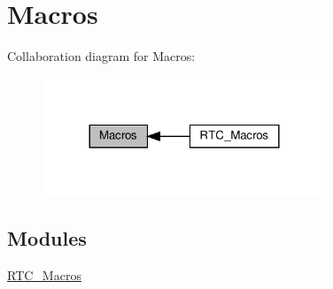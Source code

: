 \hypertarget{group___project}{}\section{Macros}
\label{group___project}
Collaboration diagram for Macros\+:
\nopagebreak
\begin{figure}[H]
\begin{center}
\leavevmode
\includegraphics[width=240pt]{group___project}
\end{center}
\end{figure}
\subsection*{Modules}
\begin{DoxyCompactItemize}
\item 
\hyperlink{group___r_t_c___macros}{R\+T\+C\+\_\+\+Macros}
\end{DoxyCompactItemize}
